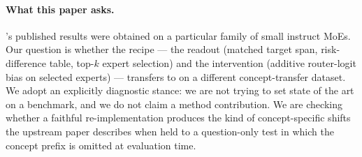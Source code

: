 \paragraph{What this paper asks.}
\steermoe's published results were obtained on a particular family of small
instruct MoEs. Our question is whether the recipe --- the readout (matched
target span, risk-difference table, top-$k$ expert selection) and the
intervention (additive router-logit bias on selected experts) --- transfers to
\mixtral on a different concept-transfer dataset. We adopt an explicitly
diagnostic stance: we are not trying to set state of the art on a benchmark,
and we do not claim a method contribution. We are checking whether a
faithful re-implementation produces the kind of concept-specific shifts the
upstream paper describes when held to a question-only test in which the
concept prefix is omitted at evaluation time.
